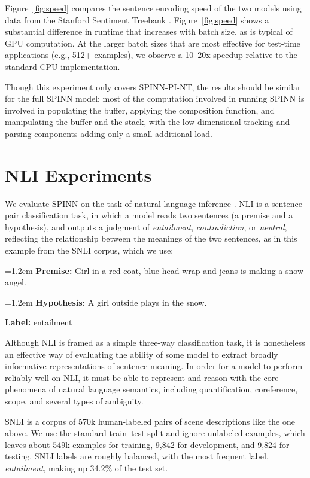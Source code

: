 \documentclass[11pt]{article}
\newcommand{\snli}[3]{{\vspace{0.25em}
{\small \setlength{\parindent}{0.6em} \hangindent=1.2em  \textbf{Premise:} #1\par}\vspace{0.25em}
{\small \setlength{\parindent}{0.6em} \hangindent=1.2em   \textbf{Hypothesis:} #2\par}\vspace{0.25em}
{\small \setlength{\parindent}{0.6em}  \textbf{Label:} #3\par}
}}
\begin{document}
Figure~\ref{fig:speed} compares the sentence encoding speed of the two models using data from the Stanford Sentiment Treebank \citep{socher2013recursive}. Figure~\ref{fig:speed} shows a substantial difference in runtime that increases with batch size, as is typical of GPU computation. At the larger batch sizes that are most effective for test-time applications (e.g., 512+ examples), we observe a 10--20x speedup relative to the standard CPU implementation.

Though this experiment only covers SPINN-PI-NT, the results should be similar for the full SPINN model: most of the computation involved in running SPINN is involved in populating the buffer, applying the composition function, and manipulating the buffer and the stack, with the low-dimensional tracking and parsing components adding only a small additional load.

\section{NLI Experiments}

We evaluate SPINN on the task of natural language inference \citep[NLI, a.k.a. recognizing textual entailment, or RTE;][]{dagan2006pascal}. NLI is a sentence pair classification task, in which a model reads two sentences (a premise and a hypothesis), and outputs a judgment of {\it entailment}, {\it contradiction}, or {\it neutral}, reflecting the relationship between the meanings of the two sentences, as in this example from the SNLI corpus, which we use: 

\snli{Girl in a red coat, blue head wrap and jeans is making a snow angel.}
{A girl outside plays in the snow.}
{entailment}

Although NLI is framed as a simple three-way classification task, it is nonetheless an effective way of evaluating the ability of some model to extract broadly informative representations of sentence meaning. In order for a model to perform reliably well on NLI, it must be able to represent and reason with the core phenomena of natural language semantics, including quantification, coreference, scope, and several types of ambiguity.

SNLI is a corpus of 570k human-labeled pairs of scene descriptions like the one above. We use the standard train--test split and ignore unlabeled examples, which leaves about 549k examples for training, 9,842 for development, and 9,824 for testing. SNLI labels are roughly balanced, with the most frequent label, {\it entailment}, making up 34.2\% of the test set.
\end{document}
